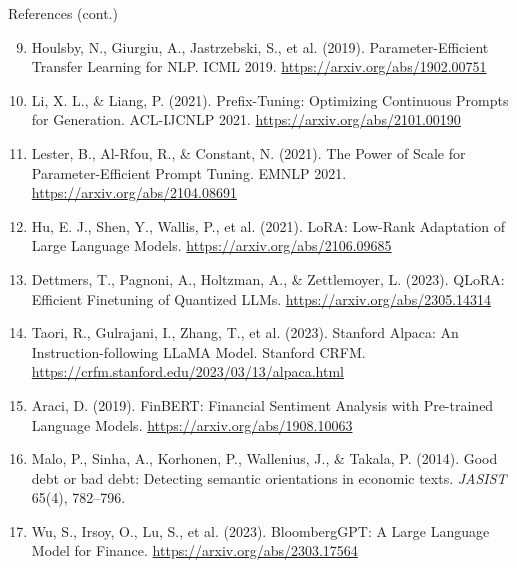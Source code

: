\begin{frame}{References (cont.)}
  \scriptsize
  \begin{enumerate}
    \setcounter{enumi}{8}
    \item Houlsby, N., Giurgiu, A., Jastrzebski, S., et al. (2019). Parameter-Efficient Transfer Learning for NLP. ICML 2019. \href{https://arxiv.org/abs/1902.00751}{https://arxiv.org/abs/1902.00751}
    \item Li, X. L., \& Liang, P. (2021). Prefix-Tuning: Optimizing Continuous Prompts for Generation. ACL-IJCNLP 2021. \href{https://arxiv.org/abs/2101.00190}{https://arxiv.org/abs/2101.00190}
    \item Lester, B., Al-Rfou, R., \& Constant, N. (2021). The Power of Scale for Parameter-Efficient Prompt Tuning. EMNLP 2021. \href{https://arxiv.org/abs/2104.08691}{https://arxiv.org/abs/2104.08691}
    \item Hu, E. J., Shen, Y., Wallis, P., et al. (2021). LoRA: Low-Rank Adaptation of Large Language Models. \href{https://arxiv.org/abs/2106.09685}{https://arxiv.org/abs/2106.09685}
    \item Dettmers, T., Pagnoni, A., Holtzman, A., \& Zettlemoyer, L. (2023). QLoRA: Efficient Finetuning of Quantized LLMs. \href{https://arxiv.org/abs/2305.14314}{https://arxiv.org/abs/2305.14314}
    \item Taori, R., Gulrajani, I., Zhang, T., et al. (2023). Stanford Alpaca: An Instruction-following LLaMA Model. Stanford CRFM. \href{https://crfm.stanford.edu/2023/03/13/alpaca.html}{https://crfm.stanford.edu/2023/03/13/alpaca.html}
    \item Araci, D. (2019). FinBERT: Financial Sentiment Analysis with Pre-trained Language Models. \href{https://arxiv.org/abs/1908.10063}{https://arxiv.org/abs/1908.10063}
    \item Malo, P., Sinha, A., Korhonen, P., Wallenius, J., \& Takala, P. (2014). Good debt or bad debt: Detecting semantic orientations in economic texts. \textit{JASIST} 65(4), 782--796.
    \item Wu, S., Irsoy, O., Lu, S., et al. (2023). BloombergGPT: A Large Language Model for Finance. \href{https://arxiv.org/abs/2303.17564}{https://arxiv.org/abs/2303.17564}
  \end{enumerate}
\end{frame}

